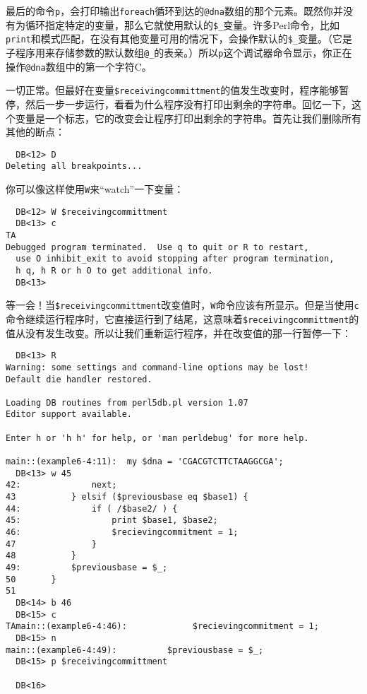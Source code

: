 最后的命令\verb|p|，会打印输出\verb|foreach|循环到达的\verb|@dna|数组的那个元素。既然你并没有为循环指定特定的变量，那么它就使用默认的\verb|$_|变量。许多Perl命令，比如\verb|print|和模式匹配，在没有其他变量可用的情况下，会操作默认的\verb|$_|变量。（它是子程序用来存储参数的默认数组\verb|@_|的表亲。）所以\verb|p|这个调试器命令显示，你正在操作\verb|@dna|数组中的第一个字符C。

一切正常。但最好在变量\verb|$receivingcommittment|的值发生改变时，程序能够暂停，然后一步一步运行，看看为什么程序没有打印出剩余的字符串。回忆一下，这个变量是一个标志，它的改变会让程序打印出剩余的字符串。首先让我们删除所有其他的断点：

\begin{lstlisting}
  DB<12> D
Deleting all breakpoints...
\end{lstlisting}

你可以像这样使用\verb|W|来“watch”一下变量：

\begin{lstlisting}
  DB<12> W $receivingcommittment
  DB<13> c
TA
Debugged program terminated.  Use q to quit or R to restart,
  use O inhibit_exit to avoid stopping after program termination,
  h q, h R or h O to get additional info.  
  DB<13> 
\end{lstlisting}

等一会！当\verb|$receivingcommittment|改变值时，\verb|W|命令应该有所显示。但是当使用\verb|c|命令继续运行程序时，它直接运行到了结尾，这意味着\verb|$receivingcommittment|的值从没有发生改变。所以让我们重新运行程序，并在改变值的那一行暂停一下：

\begin{lstlisting}
  DB<13> R
Warning: some settings and command-line options may be lost!
Default die handler restored.

Loading DB routines from perl5db.pl version 1.07
Editor support available.

Enter h or 'h h' for help, or 'man perldebug' for more help.

main::(example6-4:11):	my $dna = 'CGACGTCTTCTAAGGCGA';
  DB<13> w 45
42:              next;
43           } elsif ($previousbase eq $base1) {
44:              if ( /$base2/ ) {
45:                  print $base1, $base2; 
46:                  $recievingcommitment = 1;
47               }
48           }
49:          $previousbase = $_;
50       }
51
  DB<14> b 46
  DB<15> c
TAmain::(example6-4:46):             $recievingcommitment = 1;
  DB<15> n
main::(example6-4:49):          $previousbase = $_;
  DB<15> p $receivingcommittment

  DB<16> 
\end{lstlisting}

